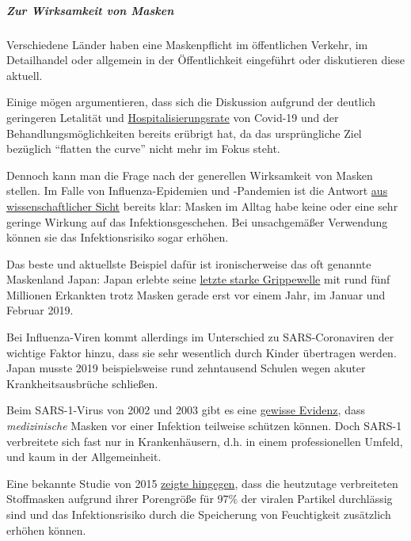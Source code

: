 \hypertarget{zur-wirksamkeit-von-masken-1}{%
\subparagraph{\texorpdfstring{\textbf{Zur Wirksamkeit von
Masken}}{Zur Wirksamkeit von Masken}}\label{zur-wirksamkeit-von-masken-1}}

Verschiedene Länder haben eine Maskenpflicht im öffentlichen Verkehr, im
Detailhandel oder allgemein in der Öffentlichkeit eingeführt oder
diskutieren diese aktuell.

Einige mögen argumentieren, dass sich die Diskussion aufgrund der
deutlich geringeren Letalität und
\href{https://swprs.org/studies-on-covid-19-lethality/\#hospitalizations}{Hospitalisierungsrate}
von Covid-19 und der Behandlungs­möglichkeiten bereits erübrigt hat, da
das ursprüngliche Ziel bezüglich ``flatten the curve'' nicht mehr im
Fokus steht.

Dennoch kann man die Frage nach der generellen Wirksamkeit von Masken
stellen. Im Falle von Influenza-Epidemien und -Pandemien ist die Antwort
\href{https://wwwnc.cdc.gov/eid/article/26/5/19-0994_article}{aus
wissenschaftlicher Sicht} bereits klar: Masken im Alltag habe keine oder
eine sehr geringe Wirkung auf das Infektionsgeschehen. Bei unsachgemäßer
Verwendung können sie das Infektionsrisiko sogar erhöhen.

Das beste und aktuellste Beispiel dafür ist ironischerweise das oft
genannte Maskenland Japan: Japan erlebte seine
\href{https://www.upi.com/Top_News/World-News/2019/02/01/Millions-in-Japan-affected-as-flu-outbreak-grips-country/9191549043797/}{letzte
starke Grippewelle} mit rund fünf Millionen Erkankten trotz Masken
gerade erst vor einem Jahr, im Januar und Februar 2019.

Bei Influenza-Viren kommt allerdings im Unterschied zu SARS-Coronaviren
der wichtige Faktor hinzu, dass sie sehr wesentlich durch Kinder
übertragen werden. Japan musste 2019 beispielsweise rund zehntausend
Schulen wegen akuter Krankheitsausbrüche schließen.

Beim SARS-1-Virus von 2002 und 2003 gibt es eine
\href{https://onlinelibrary.wiley.com/doi/10.1111/j.1750-2659.2011.00307.x}{gewisse
Evidenz}, dass \emph{medizinische} Masken vor einer Infektion teilweise
schützen können. Doch SARS-1 verbreitete sich fast nur in
Krankenhäusern, d.h. in einem professionellen Umfeld, und kaum in der
Allgemeinheit.

Eine bekannte Studie von 2015
\href{https://bmjopen.bmj.com/content/5/4/e006577}{zeigte hingegen},
dass die heutzutage verbreiteten Stoffmasken aufgrund ihrer Porengröße
für 97\% der viralen Partikel durchlässig sind und das Infektionsrisiko
durch die Speicherung von Feuchtigkeit zusätzlich erhöhen können.

